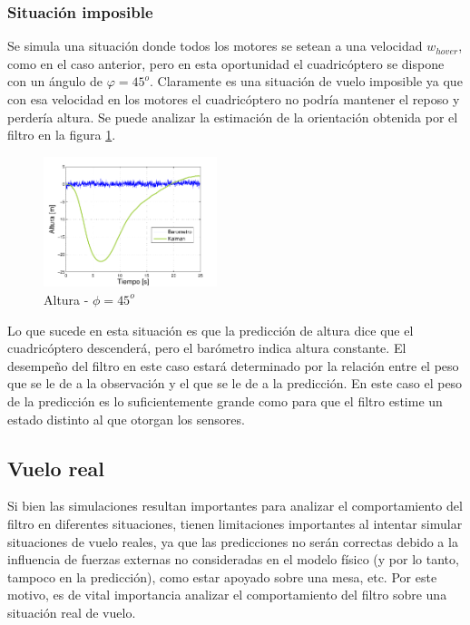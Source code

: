\documentclass[main]{subfiles}
\begin{document}
\subsubsection{Situación imposible}

Se simula una situación donde todos los motores se setean a una velocidad $w_{hover}$, como en el caso anterior, pero en esta oportunidad el cuadricóptero se dispone con un ángulo de $\varphi = 45^o$. Claramente es una situación de vuelo imposible ya que con esa velocidad en los motores el cuadricóptero no podría mantener el reposo y perdería altura. Se puede analizar la estimación de la orientación obtenida por el filtro en la figura \ref{fig:45}.

\begin{figure}
	\begin{center}	
	\vspace{-45pt}
	\includegraphics[width=0.45\textwidth]
		{./pics_kalman/altura_inclinado_45.pdf}
	\end{center}
	\vspace{-20pt}
	\caption{Altura - $\phi = 45^o$}
	\vspace{-20pt}
	\label{fig:45}
\end{figure}

Lo que sucede en esta situación es que la predicción de altura dice que el cuadricóptero descenderá, pero el barómetro indica altura constante. El desempeño del filtro en este caso estará determinado por la relación entre el peso que se le de a la observación y el que se le de a la predicción. En este caso el peso de la predicción es lo suficientemente grande como para que el filtro estime un estado distinto al que otorgan los sensores.

\subsection{Vuelo real}

Si bien las simulaciones resultan importantes para analizar el comportamiento del filtro en diferentes situaciones, tienen limitaciones importantes al intentar simular situaciones de vuelo reales, ya que las predicciones no serán correctas debido a la influencia de fuerzas externas no consideradas en el modelo físico (y por lo tanto, tampoco en la predicción), como estar apoyado sobre una mesa, etc. Por este motivo, es de vital importancia analizar el comportamiento del filtro sobre una situación real de vuelo.\\
\end{document}
